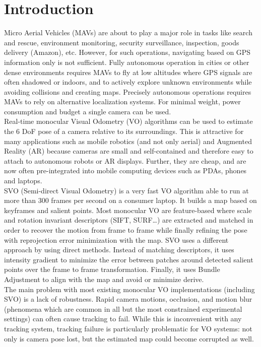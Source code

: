 \chapter{Introduction}\label{sec:introduction}
Micro Aerial Vehicles (MAVs) are about to play a major role in tasks like search and rescue, environment monitoring, security surveillance, inspection, goods delivery (Amazon), etc.  However, for such operations, navigating based on GPS information only is not sufficient. Fully autonomous operation in cities or other dense environments requires MAVs to fly at low altitudes where GPS signals are often shadowed or indoors, and to actively explore unknown environments while avoiding collisions and creating maps. Precisely autonomous operations requires MAVs to rely on alternative localization systems. For minimal weight, power consumption and budget a single camera can be used.\\

Real-time monocular Visual Odometry (VO) algorithms can be used to estimate the 6 DoF pose of a camera relative to its surroundings. This is attractive for many applications such as mobile robotics (and not only aerial) and Augmented Reality (AR) because cameras are small and self-contained and therefore easy to attach to autonomous robots or AR displays. Further, they are cheap, and are now often pre-integrated into mobile computing devices such as PDAs, phones and laptops.\\

SVO (Semi-direct Visual Odometry) \cite{Forster2014} is a very fast VO algorithm able to run at more than 300 frames per second on a consumer laptop. It builds a map based on keyframes and salient points. Most monocular VO are feature-based where scale and rotation invariant descriptors (SIFT, SURF\ldots) are extracted and matched in order to recover the motion from frame to frame while finally refining the pose with reprojection error minimization with the map. SVO uses a different approach by using direct methods. Instead of matching descriptors, it uses intensity gradient to minimize the error between patches around detected salient points over the frame to frame transformation. Finally, it uses Bundle Adjustment to align with the map and avoid or minimize derive.\\

The main problem with most existing monocular VO implementations (including SVO) is a lack of robustness. Rapid camera motions, occlusion, and motion blur (phenomena which are common in all but the most constrained experimental settings) can often cause tracking to fail. While this is inconvenient with any tracking system, tracking failure is particularly problematic for VO systems: not only is camera pose lost, but the estimated map could become corrupted as well. \\

